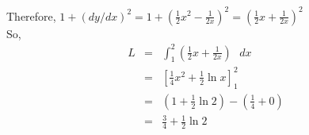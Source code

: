 \documentclass[paper=a4, fontsize=11pt]{scrartcl} %
\numberwithin{equation}{section} %
\numberwithin{figure}{section} %
\numberwithin{table}{section} %
\begin{document}
\begin{enumerate}
\begin{enumerate}
Therefore, $1+(dy/dx)^2 = 1 + \left( \frac{1}{2}x^2-\frac{1}{2x} \right)^2= \left(\frac{1}{2}x + \frac{1}{2x}\right)^2$ \\

So, 
\begin{eqnarray*}
L &=& \int_1^{2} \left(\frac{1}{2}x + \frac{1}{2x}\right) \text{ } dx \\
&=&  \left[\frac{1}{4}x^2 + \frac{1}{2} \ln x\right]_1^2  \\
&=& \left( 1 + \frac{1}{2} \ln 2 \right)   - \left( \frac{1}{4} + 0 \right)    \\
&=&  \frac{3}{4} + \frac{1}{2} \ln 2  
\end{eqnarray*}

\end{enumerate}

\newpage

\end{enumerate}

\end{document}
